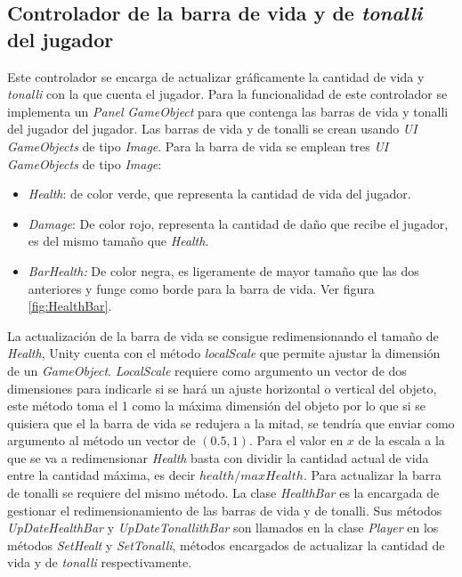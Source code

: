 \subsection{Controlador de la barra de vida y de \textit{tonalli} del jugador}
Este controlador se encarga de actualizar gráficamente la cantidad de vida y
\textit{tonalli} con la que cuenta el jugador. Para la funcionalidad de este
controlador se implementa un \textit{Panel} \textit{GameObject} para que
contenga las barras de vida y tonalli del jugador del jugador. Las barras de
vida y de tonalli se crean usando \textit{UI GameObjects} de tipo
\textit{Image}. Para la barra de vida se emplean tres \textit{UI GameObjects} de
tipo \textit{Image}:  
    \begin{itemize}
        \item \textit{Health}: de color verde, que representa la cantidad de
        vida del jugador.
        \item \textit{Damage}: De color rojo, representa la cantidad de daño que
        recibe el jugador, es del mismo tamaño que \textit{Health}.
        \item \textit{BarHealth:} De color negra, es ligeramente de mayor tamaño
        que las dos anteriores y funge como borde para la barra de vida. Ver figura  \ref{fig:HealthBar}.
    \end{itemize}
La actualización de la barra de vida se consigue redimensionando el tamaño de
\textit{Health}, Unity cuenta con el método \textit{localScale} que permite
ajustar la dimensión de un \textit{GameObject}. \textit{LocalScale} requiere
como argumento un vector de dos dimensiones para indicarle si se hará un ajuste
horizontal o vertical del objeto, este método toma el 1 como la máxima dimensión
del objeto por lo que si se quisiera que el la barra de vida se redujera a la
mitad, se tendría que enviar como argumento al método un vector de $(0.5, 1)$.
Para el valor en $x$ de la escala a la que se va a redimensionar \textit{Health}
basta con dividir la cantidad actual de vida entre la cantidad máxima, es decir
$health/maxHealth$. Para actualizar la barra de tonalli se requiere del mismo
método. La clase \textit{HealthBar} es la encargada de gestionar el
redimensionamiento de las barras de vida y de tonalli. Sus métodos
\textit{UpDateHealthBar} y \textit{UpDateTonallithBar} son llamados en la clase
\textit{Player} en los métodos \textit{SetHealt} y \textit{SetTonalli}, métodos
encargados de actualizar la cantidad de vida y de \textit{tonalli}
respectivamente.

